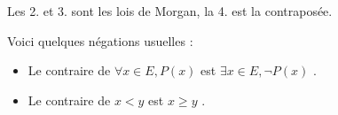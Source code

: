 \begin{remark}
    Les 2. et 3. sont les lois de Morgan, la 4. est la contraposée.
\end{remark}

\par \noindent Voici quelques négations usuelles :
\begin{itemize}
    \item Le contraire de \og $\forall x \in E, P(x)$ \fg est \og $\exists x \in E, \neg P(x)$ \fg.
    \item Le contraire de \og $x < y$ \fg est \og $x \geq y$ \fg.
\end{itemize}
